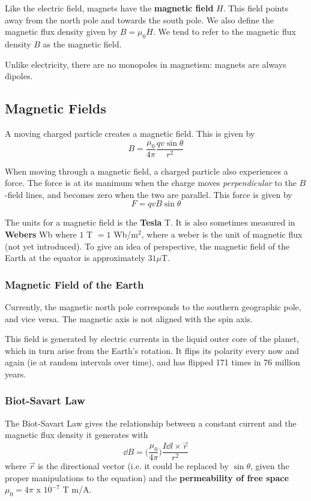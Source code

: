 \documentclass[12pt]{article}
\begin{document}
Like the electric field, magnets have the {\bf magnetic field} $H$. This field points away from the north pole and towards the south pole. We also define the magnetic flux density given by $B = \mu_0 H$. We tend to refer to the magnetic flux density $B$ as the magnetic field.

Unlike electricity, there are no monopoles in magnetism: magnets are always dipoles.

\subsection*{Magnetic Fields}
A moving charged particle creates a magnetic field. This is given by \[ B = \frac{\mu_0}{4\pi} \frac{qv\sin\theta}{r^2} \]

When moving through a magnetic field, a charged particle also experiences a force. The force is at its manimum when the charge moves \emph{perpendicular} to the $B$-field lines, and becomes zero when the two are parallel. This force is given by \[ F = qvB \sin\theta \]

The units for a magnetic field is the {\bf Tesla} T. It is also sometimes measured in {\bf Webers} Wb where $1$ T $= 1$ Wb/m$^2$, where a weber is the unit of magnetic flux (not yet introduced). To give an idea of perspective, the magnetic field of the Earth at the equator is approximately $31 \mu$T.

\subsubsection*{Magnetic Field of the Earth}
Currently, the magnetic north pole corresponds to the southern geographic pole, and vice versa. The magnetic axis is not aligned with the spin axis.

This field is generated by electric currents in the liquid outer core of the planet, which in turn arise from the Earth's rotation. It flips its polarity every now and again (ie at random intervals over time), and has flipped 171 times in 76 million years.

\subsubsection*{Biot-Savart Law}
The Biot-Savart Law gives the relationship between a constant current and the magnetic flux density it generates with \[ \dd B = \bigg( \frac{\mu_0}{4\pi} \bigg) \frac{I \dd l \times \vec{r}}{r^2} \] where $\vec{r}$ is the directional vector (i.e. it could be replaced by $\sin\theta$, given the proper manipulations to the equation) and the {\bf permeability of free space} $\mu_0 = 4\pi$ x $10^{-7}$ T m/A.
\end{document}
